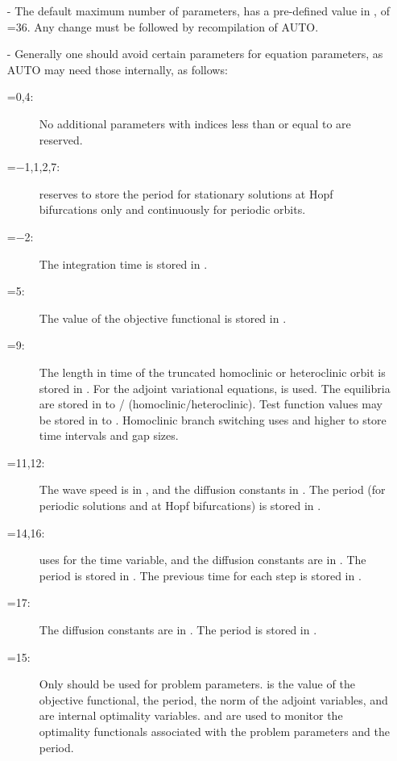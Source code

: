 \documentclass[12pt]{report}
\begin{document}
\begin{itemize}
\item[-]
  The default maximum number of parameters,  has a
  pre-defined value in ,
  of =36.
  Any change  must be followed by recompilation of {\cal AUTO}.
\item[-]
  Generally one should avoid certain parameters for equation parameters,
  as {\cal AUTO} may need those internally, as follows:
\begin{description}
\item[=0,4:]
  No additional parameters with indices less than or equal
  to  are reserved.
\item[=$-$1,1,2,7:]
  \AUTO reserves  to store the period for stationary
  solutions at Hopf bifurcations only and continuously for periodic orbits.
\item[=$-$2:]
  The integration time is stored in .
\item[=5:]
  The value of the objective functional is stored in .
\item[=9:]
  The length in time of the truncated homoclinic or heteroclinic orbit
  is stored in . For the adjoint variational equations,
   is used. The equilibria are stored
  in  to /
  (homoclinic/heteroclinic). Test function values may be stored in
   to . Homoclinic branch switching uses
   and higher to store time intervals and gap sizes.
\item[=11,12:]
  The wave speed is in , and the diffusion 
  constants in . The period (for periodic
  solutions and at Hopf bifurcations) is stored in .
\item[=14,16:]
  \AUTO uses  for the time variable, and the diffusion 
  constants are in . The period is stored in
  . The previous time for each step is stored in .
\item[=17:]
  The diffusion constants are in .
  The period is stored in .
\item[=15:]
  Only  should be used for problem parameters.
   is the value of the objective
  functional,  the period,  the norm of the
  adjoint variables,  and  are internal optimality
  variables.  and  are used to monitor the 
  optimality functionals associated with the problem parameters and
  the period.
\end{description}
\end{itemize}
\end{document}

